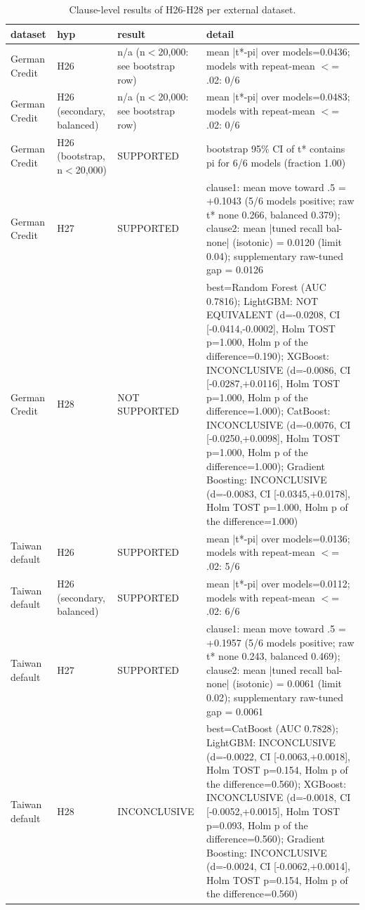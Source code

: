 \begin{table}[t]
\centering
\caption{Clause-level results of H26-H28 per external dataset.}
\label{tab:T16b_external_verdict_detail}
\small
\begin{tabular}{lllp{5.2cm}}
\toprule
dataset & hyp & result & detail \\
\midrule
German Credit & H26 & n/a (n$<$20,000: see bootstrap row) & mean |t*-pi| over models=0.0436; models with repeat-mean $<$= .02: 0/6 \\
German Credit & H26 (secondary, balanced) & n/a (n$<$20,000: see bootstrap row) & mean |t*-pi| over models=0.0483; models with repeat-mean $<$= .02: 0/6 \\
German Credit & H26 (bootstrap, n$<$20,000) & SUPPORTED & bootstrap 95\% CI of t* contains pi for 6/6 models (fraction 1.00) \\
German Credit & H27 & SUPPORTED & clause1: mean move toward .5 = +0.1043 (5/6 models positive; raw t* none 0.266, balanced 0.379); clause2: mean |tuned recall bal-none| (isotonic) = 0.0120 (limit 0.04); supplementary raw-tuned gap = 0.0126 \\
German Credit & H28 & NOT SUPPORTED & best=Random Forest (AUC 0.7816); LightGBM: NOT EQUIVALENT (d=-0.0208, CI [-0.0414,-0.0002], Holm TOST p=1.000, Holm p of the difference=0.190); XGBoost: INCONCLUSIVE (d=-0.0086, CI [-0.0287,+0.0116], Holm TOST p=1.000, Holm p of the difference=1.000); CatBoost: INCONCLUSIVE (d=-0.0076, CI [-0.0250,+0.0098], Holm TOST p=1.000, Holm p of the difference=1.000); Gradient Boosting: INCONCLUSIVE (d=-0.0083, CI [-0.0345,+0.0178], Holm TOST p=1.000, Holm p of the difference=1.000) \\
Taiwan default & H26 & SUPPORTED & mean |t*-pi| over models=0.0136; models with repeat-mean $<$= .02: 5/6 \\
Taiwan default & H26 (secondary, balanced) & SUPPORTED & mean |t*-pi| over models=0.0112; models with repeat-mean $<$= .02: 6/6 \\
Taiwan default & H27 & SUPPORTED & clause1: mean move toward .5 = +0.1957 (5/6 models positive; raw t* none 0.243, balanced 0.469); clause2: mean |tuned recall bal-none| (isotonic) = 0.0061 (limit 0.02); supplementary raw-tuned gap = 0.0061 \\
Taiwan default & H28 & INCONCLUSIVE & best=CatBoost (AUC 0.7828); LightGBM: INCONCLUSIVE (d=-0.0022, CI [-0.0063,+0.0018], Holm TOST p=0.154, Holm p of the difference=0.560); XGBoost: INCONCLUSIVE (d=-0.0018, CI [-0.0052,+0.0015], Holm TOST p=0.093, Holm p of the difference=0.560); Gradient Boosting: INCONCLUSIVE (d=-0.0024, CI [-0.0062,+0.0014], Holm TOST p=0.154, Holm p of the difference=0.560) \\
\bottomrule
\end{tabular}
\end{table}
